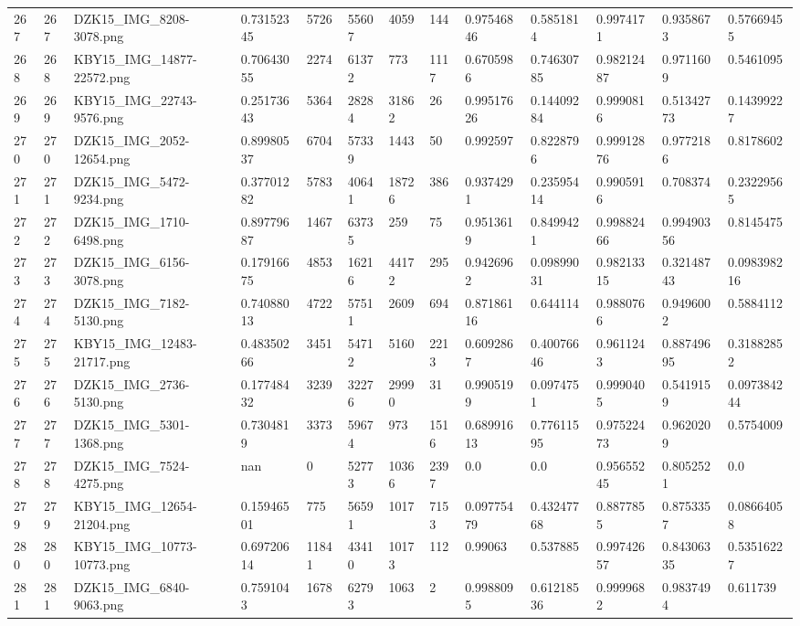 \documentclass[11pt, a4paper, twoside]{report}
\begin{document}
\begin{longtable}[c]{@{}lllllllllllll@{}}
267 & 267 & DZK15\_IMG\_8208-3078.png & 0.73152345 & 5726 & 55607 & 4059 & 144 & 0.97546846 & 0.5851814 & 0.9974171 & 0.9358673 & 0.57669455 \\
268 & 268 & KBY15\_IMG\_14877-22572.png & 0.70643055 & 2274 & 61372 & 773 & 1117 & 0.6705986 & 0.74630785 & 0.98212487 & 0.9711609 & 0.5461095 \\
269 & 269 & KBY15\_IMG\_22743-9576.png & 0.25173643 & 5364 & 28284 & 31862 & 26 & 0.99517626 & 0.14409284 & 0.9990816 & 0.51342773 & 0.14399227 \\
270 & 270 & DZK15\_IMG\_2052-12654.png & 0.89980537 & 6704 & 57339 & 1443 & 50 & 0.992597 & 0.8228796 & 0.99912876 & 0.9772186 & 0.8178602 \\
271 & 271 & DZK15\_IMG\_5472-9234.png & 0.37701282 & 5783 & 40641 & 18726 & 386 & 0.9374291 & 0.23595414 & 0.9905916 & 0.708374 & 0.23229565 \\
272 & 272 & DZK15\_IMG\_1710-6498.png & 0.89779687 & 1467 & 63735 & 259 & 75 & 0.9513619 & 0.8499421 & 0.99882466 & 0.99490356 & 0.8145475 \\
273 & 273 & DZK15\_IMG\_6156-3078.png & 0.17916675 & 4853 & 16216 & 44172 & 295 & 0.9426962 & 0.09899031 & 0.98213315 & 0.32148743 & 0.098398216 \\
274 & 274 & DZK15\_IMG\_7182-5130.png & 0.74088013 & 4722 & 57511 & 2609 & 694 & 0.87186116 & 0.644114 & 0.9880766 & 0.9496002 & 0.5884112 \\
275 & 275 & KBY15\_IMG\_12483-21717.png & 0.48350266 & 3451 & 54712 & 5160 & 2213 & 0.6092867 & 0.40076646 & 0.9611243 & 0.88749695 & 0.31882852 \\
276 & 276 & DZK15\_IMG\_2736-5130.png & 0.17748432 & 3239 & 32276 & 29990 & 31 & 0.9905199 & 0.0974751 & 0.9990405 & 0.5419159 & 0.097384244 \\
277 & 277 & DZK15\_IMG\_5301-1368.png & 0.7304819 & 3373 & 59674 & 973 & 1516 & 0.68991613 & 0.77611595 & 0.97522473 & 0.9620209 & 0.5754009 \\
278 & 278 & DZK15\_IMG\_7524-4275.png & nan & 0 & 52773 & 10366 & 2397 & 0.0 & 0.0 & 0.95655245 & 0.8052521 & 0.0 \\
279 & 279 & KBY15\_IMG\_12654-21204.png & 0.15946501 & 775 & 56591 & 1017 & 7153 & 0.09775479 & 0.43247768 & 0.8877855 & 0.8753357 & 0.08664058 \\
280 & 280 & KBY15\_IMG\_10773-10773.png & 0.69720614 & 11841 & 43410 & 10173 & 112 & 0.99063 & 0.537885 & 0.99742657 & 0.84306335 & 0.53516227 \\
281 & 281 & DZK15\_IMG\_6840-9063.png & 0.7591043 & 1678 & 62793 & 1063 & 2 & 0.9988095 & 0.61218536 & 0.9999682 & 0.9837494 & 0.611739 \\

\end{longtable}
\end{document}
